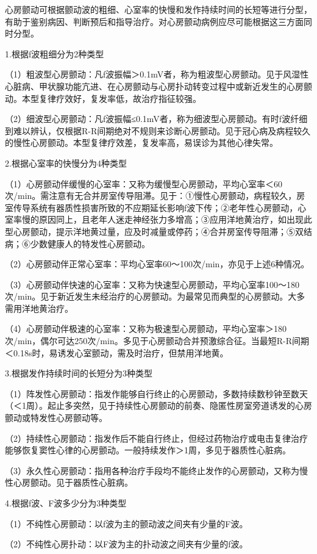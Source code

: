 心房颤动可根据颤动波的粗细、心室率的快慢和发作持续时间的长短等进行分型，有助于鉴别病因、判断预后和指导治疗。对心房颤动病例应尽可能根据这三方面同时分型。

1.根据f波粗细分为2种类型

（1）粗波型心房颤动：凡f波振幅＞0.1mV者，称为粗波型心房颤动。见于风湿性心脏病、甲状腺功能亢进、在心房颤动与心房扑动转变过程中或新近发生的心房颤动。本型复律疗效好，复发率低，故治疗指征较强。

（2）细波型心房颤动：凡f波振幅≤0.1mV者，称为细波型心房颤动。有时f波纤细到难以辨认，仅根据R-R间期绝对不规则来诊断心房颤动。见于冠心病及病程较久的慢性心房颤动。本型复律疗效差，复发率高，易误诊为其他心律失常。

2.根据心室率的快慢分为4种类型

（1）心房颤动伴缓慢的心室率：又称为缓慢型心房颤动，平均心室率＜60次/min。需注意有无合并房室传导阻滞。见于：①慢性心房颤动，病程较久，房室传导系统有器质性损害所致的不应期延长影响f波下传；②老年性心房颤动，心室率慢的原因同上，且老年人迷走神经张力多增高；③应用洋地黄治疗，如出现此型心房颤动，提示洋地黄过量，应及时减量或停药；④合并房室传导阻滞；⑤双结病；⑥少数健康人的特发性心房颤动。

（2）心房颤动伴正常心室率：平均心室率60～100次/min，亦见于上述6种情况。

（3）心房颤动伴快速的心室率：又称为快速型心房颤动，平均心室率100～180次/min。见于新近发生未经治疗的心房颤动。为最常见而典型的心房颤动。大多需用洋地黄治疗。

（4）心房颤动伴极速的心室率：又称为极速型心房颤动，平均心室率＞180次/min，偶尔可达250次/min。多见于心房颤动合并预激综合征。当最短R-R间期＜0.18s时，易诱发心室颤动，需及时治疗，但禁用洋地黄。

3.根据发作持续时间的长短分为3种类型

（1）阵发性心房颤动：指发作能够自行终止的心房颤动，多数持续数秒钟至数天（＜1周）。起止多突然，见于持续性心房颤动的前奏、隐匿性房室旁道诱发的心房颤动或特发性心房颤动等。

（2）持续性心房颤动：指发作后不能自行终止，但经过药物治疗或电击复律治疗能够恢复窦性心律的心房颤动。一般持续发作＞1周，多见于器质性心脏病。

（3）永久性心房颤动：指用各种治疗手段均不能终止发作的心房颤动，又称为慢性心房颤动。见于器质性心脏病。

4.根据f波、F波多少分为3种类型

（1）不纯性心房颤动：以f波为主的颤动波之间夹有少量的F波。

（2）不纯性心房扑动：以F波为主的扑动波之间夹有少量的f波。

